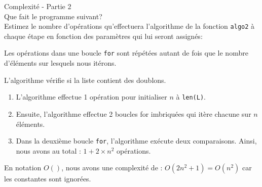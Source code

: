 \begin{Exercice}[5 min] Complexité - Partie 2\\
    Que fait le programme suivant? \\
    Estimez le nombre d'opérations qu'effectuera l'algorithme de la fonction \lstinline{algo2} à chaque étape en fonction des paramètres qui lui seront assignés:
    
\begin{conseil}
   Les opérations dans une boucle \lstinline{for} sont répétées autant de fois que le 
   nombre d'éléments sur lesquels nous itérons.
\end{conseil}
    
\begin{solution}
    L'algorithme vérifie si la liste contient des doublons.
    \begin{enumerate}
        \item L'algorithme effectue 1 opération pour initialiser $n$ à \lstinline{len(L)}. 
        \item Ensuite, l'algorithme effectue 2 boucles for imbriquées qui itère chacune sur $n$ éléments. 
        \item Dans la deuxième boucle \lstinline{for}, l'algorithme exécute deux comparaisons. 
        Ainsi, nous avons au total : $1 + 2 \times n^2$ opérations. \\
    \end{enumerate}
    En notation $O()$, nous avons une complexité de : $O(2n^2 + 1) = O(n^2)$ car les constantes sont ignorées. 
       
\end{solution}

\end{Exercice}

